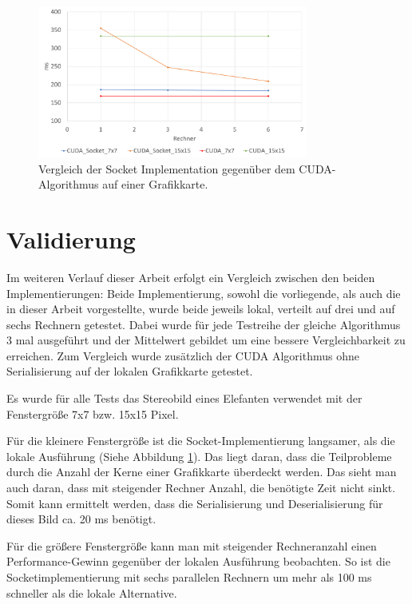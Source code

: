 \documentclass[conference]{IEEEtran}
\begin{document}
\begin{figure}[!t]
	\centering
	\includegraphics[width=3.5in]{SocketvsCUDA_bunt_3.pdf}
	\caption{Vergleich der Socket Implementation gegenüber dem CUDA-Algorithmus auf einer Grafikkarte.}
	\label{fig_socket_cuda}
\end{figure}

\section{Validierung}
Im weiteren Verlauf dieser Arbeit erfolgt ein Vergleich zwischen den beiden Implementierungen: 
Beide Implementierung, sowohl die vorliegende, als auch die in dieser Arbeit vorgestellte, wurde beide jeweils lokal, verteilt auf drei und auf sechs Rechnern getestet. Dabei wurde für jede Testreihe der gleiche Algorithmus 3 mal ausgeführt und der Mittelwert gebildet um eine bessere Vergleichbarkeit zu erreichen. Zum Vergleich wurde zusätzlich der CUDA Algorithmus ohne Serialisierung auf der lokalen Grafikkarte getestet. 

Es wurde für alle Tests das Stereobild eines Elefanten verwendet mit der Fenstergröße 7x7 bzw. 15x15 Pixel. 

Für die kleinere Fenstergröße ist die Socket-Implementierung langsamer, als die lokale Ausführung (Siehe Abbildung \ref{fig_socket_cuda}). Das liegt daran, dass die Teilprobleme durch die Anzahl der Kerne einer Grafikkarte überdeckt werden. Das sieht man auch daran, dass mit steigender Rechner Anzahl, die benötigte Zeit nicht sinkt. Somit kann ermittelt werden, dass die Serialisierung und Deserialisierung für dieses Bild ca. 20 ms benötigt.

Für die größere Fenstergröße kann man mit steigender Rechneranzahl einen Performance-Gewinn gegenüber der lokalen Ausführung beobachten. So ist die Socketimplementierung mit sechs parallelen Rechnern um mehr als 100 ms schneller als die lokale Alternative.
\end{document}
